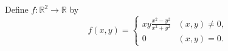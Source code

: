 \documentclass[12pt]{article}
\newenvironment{problem}[2][Problem]{\begin{trivlist}
\item[\hskip \labelsep {\bfseries #1}\hskip \labelsep {\bfseries #2.}]}{\end{trivlist}}
\begin{document}
\begin{problem}{2-24}
Define $f:\mathbb{R}^2\rightarrow \mathbb{R}$ by $$f\left(x,y\right) = \left\{ \begin{array}{lr} xy\frac{x^2-y^2}{x^2+y^2} & \left(x,y\right)\neq 0, \\ 0 & \left(x,y\right)=0. \end{array}\right. $$
\end{problem}




 
\end{document}
